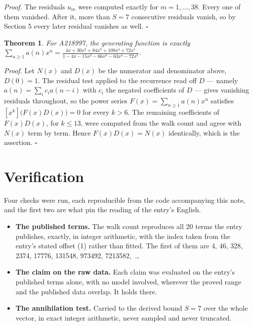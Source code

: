 \documentclass[11pt]{article}
\newtheorem{theorem}{Theorem}
\theoremstyle{definition}
\begin{document}
{\itshape Proof.} The residuals $u_m$ were computed exactly for $m = 1,\dots,38$. Every one of them vanished. After it, more than $S = 7$ consecutive residuals vanish, so by Section 5 every later residual vanishes as well. $\square$

\begin{theorem} For A218997, the generating function is exactly $\sum_{n\ge 1} a(n)x^n = \frac{4x + 30x^{2} + 84x^{3} + 108x^{4} + 72x^{5}}{1 - 4x - 15x^{2} - 66x^{3} - 63x^{4} - 72x^{5}}$.\end{theorem}

{\itshape Proof.} Let $N(x)$ and $D(x)$ be the numerator and denominator above, $D(0)=1$. The residual test applied to the recurrence read off $D$ --- namely $a(n) = \sum_i c_i a(n-i)$ with $c_i$ the negated coefficients of $D$ --- gives vanishing residuals throughout, so the power series $F(x)=\sum_{n\ge 1}a(n)x^n$ satisfies $[x^k]\bigl(F(x)D(x)\bigr) = 0$ for every $k > 6$. The remaining coefficients of $F(x)D(x)$, for $k \le 13$, were computed from the walk count and agree with $N(x)$ term by term. Hence $F(x)D(x) = N(x)$ identically, which is the assertion. $\square$

\section{Verification}

Four checks were run, each reproducible from the code accompanying this note, and the first two are what pin the reading of the entry's English.

\begin{itemize}

\item {\bfseries The published terms.} The walk count reproduces all 20 terms the entry publishes, exactly, in integer arithmetic, with the index taken from the entry's stated offset (1) rather than fitted. The first of them are 4, 46, 328, 2374, 17776, 131548, 973492, 7213582,~\dots

\item {\bfseries The claim on the raw data.} Each claim was evaluated on the entry's published terms alone, with no model involved, wherever the proved range and the published data overlap. It holds there.

\item {\bfseries The annihilation test.} Carried to the derived bound $S = 7$ over the whole vector, in exact integer arithmetic, never sampled and never truncated.

\end{itemize}
\end{document}
